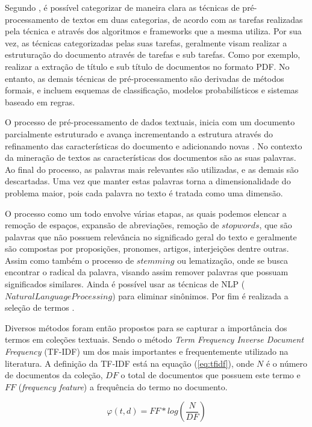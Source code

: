 Segundo \cite{Feldman2007}, é possível categorizar de maneira clara as técnicas de pré-processamento
de textos em duas categorias, de acordo com as tarefas realizadas pela técnica e através dos
algoritmos e frameworks que a mesma utiliza. Por sua vez, as técnicas categorizadas pelas suas
tarefas, geralmente visam realizar a estruturação do documento através de tarefas e sub tarefas.
Como por exemplo, realizar a extração de título e sub título de documentos no formato PDF.  No
entanto, as demais técnicas de pré-processamento são derivadas de métodos formais, e incluem
esquemas de classificação, modelos probabilísticos e sistemas baseado em regras.

O processo de pré-processamento de dados textuais, inicia com um documento parcialmente estruturado
e avança incrementando a estrutura através do refinamento das características do documento e
adicionando novas \cite{Feldman2007}.  No contexto da mineração de textos as características dos
documentos são as suas palavras\cite{Haddi2013}. Ao final do processo, as palavras mais relevantes
são utilizadas, e as demais são descartadas. Uma vez que manter estas palavras torna a
dimensionalidade do problema maior, pois cada palavra no texto é tratada como uma
dimensão\cite{Haddi2013}.

O processo como um todo envolve várias etapas, as quais podemos elencar a remoção de espaços,
expansão de abreviações, remoção de $stopwords$, que são palavras que não possuem relevância no
significado geral do texto e geralmente são compostas por proposições, pronomes, artigos,
interjeições dentre outras\cite{Nogueira2013}. Assim como também o processo de $stemming$ ou
lematização, onde se busca encontrar o radical da palavra, visando assim remover palavras que
possuam significados similares. Ainda é possível usar as técnicas de NLP ($Natural Language
Processing$) para eliminar sinônimos. Por fim é realizada a seleção de termos \cite{Haddi2013}. 

Diversos métodos foram então propostos para se capturar a importância dos termos em coleções
textuais. Sendo o método { \it Term Frequency Inverse Document Frequency\/ }(TF-IDF) um dos mais
importantes\cite{Haddi2013} e frequentemente utilizado na literatura. A definição da TF-IDF está na
equação (\ref{eq:tfidf}), onde $N$ é o número de documentos da coleção, $DF$ o total de documentos
que possuem este termo e $FF$ ({\it frequency feature}) a frequência do termo no documento.

\begin{equation} \varphi(t,d) = FF * log(\frac{N}{DF}) \label{eq:tfidf} \end{equation}


